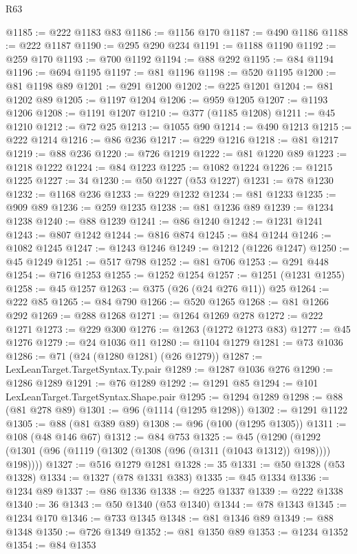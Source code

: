 \begin{lexlean}{R63}
\begin{coremodule}
@1185 := @222 @1183 @83
@1186 := @1156 @170
@1187 := @490 @1186
@1188 := @222 @1187
@1190 := @295 @290 @234
@1191 := @1188 @1190
@1192 := @259 @170
@1193 := @700 @1192
@1194 := @88 @292
@1195 := @84 @1194
@1196 := @694 @1195
@1197 := @81 @1196
@1198 := @520 @1195
@1200 := @81 @1198 @89
@1201 := @291 @1200
@1202 := @225 @1201
@1204 := @81 @1202 @89
@1205 := @1197 @1204
@1206 := @959 @1205
@1207 := @1193 @1206
@1208 := @1191 @1207
@1210 := @377 (@1185 @1208)
@1211 := @45 @1210
@1212 := @72 @25
@1213 := @1055 @90
@1214 := @490 @1213
@1215 := @222 @1214
@1216 := @86 @236
@1217 := @229 @1216
@1218 := @81 @1217
@1219 := @88 @236
@1220 := @726 @1219
@1222 := @81 @1220 @89
@1223 := @1218 @1222
@1224 := @84 @1223
@1225 := @1082 @1224
@1226 := @1215 @1225
@1227 := 34
@1230 := @50 @1227 (@53 @1227)
@1231 := @78 @1230
@1232 := @1168 @236
@1233 := @229 @1232
@1234 := @81 @1233
@1235 := @909 @89
@1236 := @259 @1235
@1238 := @81 @1236 @89
@1239 := @1234 @1238
@1240 := @88 @1239
@1241 := @86 @1240
@1242 := @1231 @1241
@1243 := @807 @1242
@1244 := @816 @874
@1245 := @84 @1244
@1246 := @1082 @1245
@1247 := @1243 @1246
@1249 := @1212 (@1226 @1247)
@1250 := @45 @1249
@1251 := @517 @798
@1252 := @81 @706
@1253 := @291 @448
@1254 := @716 @1253
@1255 := @1252 @1254
@1257 := @1251 (@1231 @1255)
@1258 := @45 @1257
@1263 := @375 (@26 (@24 @276 @11)) @25
@1264 := @222 @85
@1265 := @84 @790
@1266 := @520 @1265
@1268 := @81 @1266 @292
@1269 := @288 @1268
@1271 := @1264 @1269 @278
@1272 := @222 @1271
@1273 := @229 @300
@1276 := @1263 (@1272 @1273 @83)
@1277 := @45 @1276
@1279 := @24 @1036 @11
@1280 := @1104 @1279
@1281 := @73 @1036
@1286 := @71 (@24 (@1280 @1281) (@26 @1279))
@1287 := LexLeanTarget.TargetSyntax.Ty.pair
@1289 := @1287 @1036 @276
@1290 := @1286 @1289
@1291 := @76 @1289
@1292 := @1291 @85
@1294 := @101 LexLeanTarget.TargetSyntax.Shape.pair
@1295 := @1294 @1289
@1298 := @88 (@81 @278 @89)
@1301 := @96 (@1114 (@1295 @1298))
@1302 := @1291 @1122
@1305 := @88 (@81 @389 @89)
@1308 := @96 (@100 (@1295 @1305))
@1311 := @108 (@48 @146 @67)
@1312 := @84 @753
@1325 := @45
    (@1290 (@1292 (@1301 (@96 (@1119 (@1302 (@1308 (@96 (@1311 (@1043 @1312)) @198)))) @198))))
@1327 := @516 @1279 @1281
@1328 := 35
@1331 := @50 @1328 (@53 @1328)
@1334 := @1327 (@78 @1331 @383)
@1335 := @45 @1334
@1336 := @1234 @89
@1337 := @86 @1336
@1338 := @225 @1337
@1339 := @222 @1338
@1340 := 36
@1343 := @50 @1340 (@53 @1340)
@1344 := @78 @1343
@1345 := @1234 @170
@1346 := @733 @1345
@1348 := @81 @1346 @89
@1349 := @88 @1348
@1350 := @726 @1349
@1352 := @81 @1350 @89
@1353 := @1234 @1352
@1354 := @84 @1353

\end{coremodule}
\end{lexlean}
